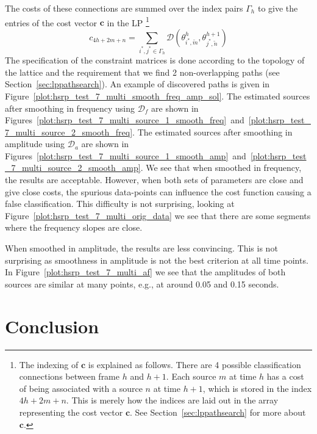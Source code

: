 The costs of these connections
are summed over the index pairs $\Gamma_{h}$ to give the entries of the cost
vector $\boldsymbol{c}$ in the LP%
\footnote{The indexing of $\boldsymbol{c}$ is explained as follows. There are 4
    possible classification connections between frame $h$ and $h+1$. Each source
    $m$ at time $h$ has a cost of being associated with a source $n$ at time
    $h+1$, which is stored in the index $4h + 2m + n$. This is merely how the
    indices are laid out in the array representing the cost vector
    $\boldsymbol{c}$. See Section~\ref{sec:lppathsearch} for more about
    $\boldsymbol{c}$.}
\[
    c_{4h + 2m + n} = \sum_{i^{\ast},j^{\ast} \in \Gamma_{h}}
    \mathcal{D} \left( \theta_{i^{\ast},\tilde{m}}^{h}, \theta_{j^{\ast},\tilde{n}}^{h+1}
    \right)
\]
The specification of the constraint matrices is done according to the topology
of the lattice and the requirement that we find 2 non-overlapping paths (see
Section~\ref{sec:lppathsearch}). An example of discovered paths is given in
Figure~\ref{plot:hsrp_test_7_multi_smooth_freq_amp_sol}.
The estimated sources after smoothing in frequency using $\mathcal{D}_{f}$ are shown in
Figures~\ref{plot:hsrp_test_7_multi_source_1_smooth_freq}~and~\ref{plot:hsrp_test_7_multi_source_2_smooth_freq}.
The estimated sources after smoothing in amplitude using $\mathcal{D}_{a}$ are shown in
Figures~\ref{plot:hsrp_test_7_multi_source_1_smooth_amp}~and~\ref{plot:hsrp_test_7_multi_source_2_smooth_amp}.
We see that when smoothed in frequency, the results are acceptable. However,
when both sets of parameters are close and give close costs, the spurious
data-points can influence the cost function causing a false classification. This
difficulty is not surprising, looking at
Figure~\ref{plot:hsrp_test_7_multi_orig_data} we see that there are some
segments where the frequency slopes are close.

When smoothed in amplitude, the results are less convincing. This is not
surprising as smoothness in amplitude is not the best criterion at all time
points.
In Figure~\ref{plot:hsrp_test_7_multi_af} we see that the amplitudes of
both sources are similar at many points, e.g., at around 0.05 and 0.15 seconds.

\section{Conclusion}

